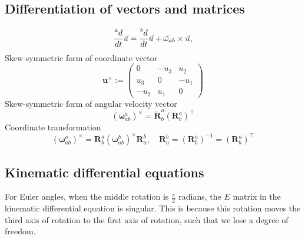 \subsection{Differentiation of vectors and matrices}
\begin{equation}
    \frac{\prescript{a}{}d}{dt} \vec{u} = \frac{\prescript{b}{}d}{dt} \vec{u} + \vec{\omega}_{ab} \times \vec{u},
\end{equation}
Skew-symmetric form of coordinate vector
\begin{equation}
    \mathbf{u}^\times := 
    \begin{pmatrix}
    0 & -u_3 & u_2\\
    u_3 & 0 & -u_1\\
    -u_2 & u_1 & 0
    \end{pmatrix}
\end{equation}
Skew-symmetric form of angular velocity vector
\begin{equation}
    (\boldsymbol{\omega}^a_{ab})^\times = \dot{\mathbf{R}}^a_b (\mathbf{R}^a_b)^\top
\end{equation}
Coordinate transformation
\begin{equation}
    (\boldsymbol{\omega}^a_{ab})^\times = \mathbf{R}^a_b (\boldsymbol{\omega}^b_{ab})^\times \mathbf{R}^b_a, \quad
    \mathbf{R}^b_a = (\mathbf{R}^a_b)^{-1} = (\mathbf{R}^a_b)^\top
\end{equation}

\subsection{Kinematic differential equations}
For Euler angles, when the middle rotation is $\frac{\pi}{2}$ radians, the $E$ matrix in the kinematic differential equation is singular. This is because this rotation moves the third axis of rotation to the first axis of rotation, such that we lose a degree of freedom. 

